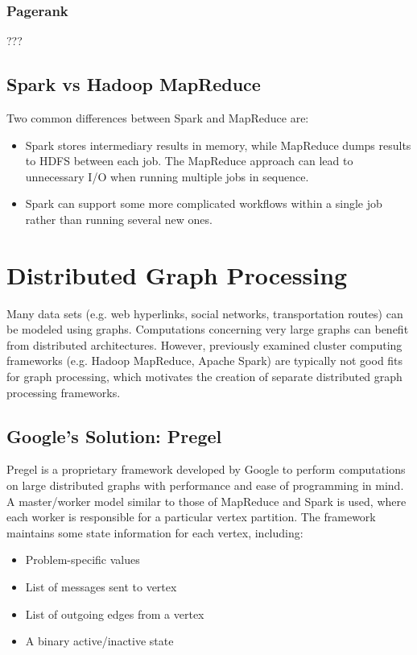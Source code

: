 \documentclass[12pt,titlepage]{article}
\let\stdsection\section
\renewcommand\section{\clearpage\stdsection}
\begin{document}
        \subsubsection{Pagerank}
        ???

    \subsection{Spark vs Hadoop MapReduce}
      Two common differences between Spark and MapReduce are:
      \begin{itemize}
        \item Spark stores intermediary results in memory, while MapReduce dumps results to HDFS between each job. The MapReduce approach can lead to unnecessary I/O
          when running multiple jobs in sequence.
        \item Spark can support some more complicated workflows within a single job rather than running several new ones.
      \end{itemize}

  \section{Distributed Graph Processing}
    Many data sets (e.g. web hyperlinks, social networks, transportation routes) can be modeled using graphs. Computations concerning very large graphs can benefit
    from distributed architectures. However, previously examined cluster computing frameworks (e.g. Hadoop MapReduce, Apache Spark) are typically not good fits for
    graph processing, which motivates the creation of separate distributed graph processing frameworks.

    \subsection{Google's Solution: Pregel}
      Pregel is a proprietary framework developed by Google to perform computations on large distributed graphs with performance and ease of programming in mind.
      A master/worker model similar to those of MapReduce and Spark is used, where each worker is responsible for a particular vertex partition. The framework
      maintains some state information for each vertex, including:
      \begin{itemize}
        \item Problem-specific values
        \item List of messages sent to vertex
        \item List of outgoing edges from a vertex
        \item A binary active/inactive state
      \end{itemize}
\end{document}
